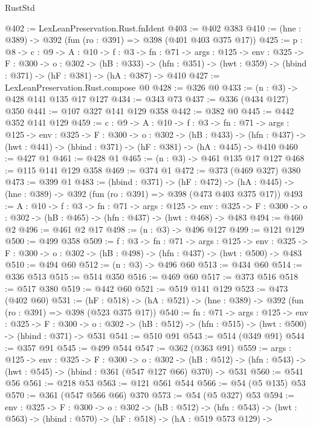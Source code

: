 \begin{lexlean}{RustStd}
\begin{coremodule}
{\begin{coremodule}
@402 := LexLeanPreservation.Rust.fnIdent
@403 := @402 @383
@410 := (hne : @389) -> @392 (fun (ro : @391) => @398 (@401 @403 @375 @17))
@425 := {p : @8} ->
  {c : @9} ->
  {A : @10} ->
  {f : @3} ->
  {fn : @71} ->
  {args : @125} ->
  {env : @325} ->
  {F : @300} ->
  {o : @302} ->
  (hB : @333) ->
  (hfn : @351) -> (hwt : @359) -> (hbind : @371) -> (hF : @381) -> (hA : @387) -> @410
@427 := LexLeanPreservation.Rust.compose @0
@428 := @326 @0
@433 := (n : @3) -> @428 @141 @135 @17 @127
@434 := @343 @73
@437 := @336 (@434 @127) @350
@441 := @107 @327 @141 @129 @358
@442 := @382 @0
@445 := @442 @352 @141 @129
@459 := {c : @9} ->
  {A : @10} ->
  {f : @3} ->
  {fn : @71} ->
  {args : @125} ->
  {env : @325} ->
  {F : @300} ->
  {o : @302} ->
  (hB : @433) ->
  (hfn : @437) -> (hwt : @441) -> (hbind : @371) -> (hF : @381) -> (hA : @445) -> @410
@460 := @427 @1
@461 := @428 @1
@465 := (n : @3) -> @461 @135 @17 @127
@468 := @115 @141 @129 @358
@469 := @374 @1
@472 := @373 (@469 @327) @380
@473 := @399 @1
@483 := (hbind : @371) ->
  (hF : @472) -> (hA : @445) -> (hne : @389) -> @392 (fun (ro : @391) => @398 (@473 @403 @375 @17))
@493 := {A : @10} ->
  {f : @3} ->
  {fn : @71} ->
  {args : @125} ->
  {env : @325} -> {F : @300} -> {o : @302} -> (hB : @465) -> (hfn : @437) -> (hwt : @468) -> @483
@494 := @460 @2
@496 := @461 @2 @17
@498 := (n : @3) -> @496 @127
@499 := @121 @129
@500 := @499 @358
@509 := {f : @3} ->
  {fn : @71} ->
  {args : @125} ->
  {env : @325} -> {F : @300} -> {o : @302} -> (hB : @498) -> (hfn : @437) -> (hwt : @500) -> @483
@510 := @494 @60
@512 := (n : @3) -> @496 @60
@513 := @434 @60
@514 := @336 @513
@515 := @514 @350
@516 := @469 @60
@517 := @373 @516
@518 := @517 @380
@519 := @442 @60
@521 := @519 @141 @129
@523 := @473 (@402 @60)
@531 := (hF : @518) -> (hA : @521) -> (hne : @389) -> @392 (fun (ro : @391) => @398 (@523 @375 @17))
@540 := {fn : @71} ->
  {args : @125} ->
  {env : @325} ->
  {F : @300} -> {o : @302} -> (hB : @512) -> (hfn : @515) -> (hwt : @500) -> (hbind : @371) -> @531
@541 := @510 @91
@543 := @514 (@349 @91)
@544 := @357 @91
@545 := @499 @544
@547 := @362 (@363 @91)
@559 := {args : @125} ->
  {env : @325} ->
  {F : @300} ->
  {o : @302} ->
  (hB : @512) -> (hfn : @543) -> (hwt : @545) -> (hbind : @361 (@547 @127 @66) @370) -> @531
@560 := @541 @56
@561 := @218 @53
@563 := @121 @561 @544
@566 := @54 (@5 @135) @53
@570 := @361 (@547 @566 @66) @370
@573 := @54 (@5 @327) @53
@594 := {env : @325} ->
  {F : @300} ->
  {o : @302} ->
  (hB : @512) ->
  (hfn : @543) ->
  (hwt : @563) ->
  (hbind : @570) ->
  (hF : @518) ->
  (hA : @519 @573 @129) ->

\end{coremodule}}
\end{coremodule}
\end{lexlean}
